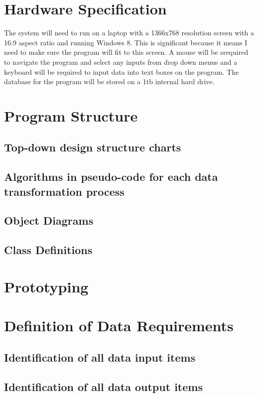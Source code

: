 \section{Hardware Specification}
The system will need to run on a laptop with a 1366x768 resolution screen with a 16:9  aspect ratio and running Windows 8. This is significant because it means I need to make sure the program will fit to this screen. A mouse will be srequired to navigate the program and select any inputs from drop down menus and a keyboard will be required to input data into text boxes on the program. The database for the program will be stored on a 1tb internal hard drive.
\section{Program Structure}

\subsection{Top-down design structure charts}

\subsection{Algorithms in pseudo-code for each data transformation process}

\subsection{Object Diagrams}

\subsection{Class Definitions}

\section{Prototyping}

\section{Definition of Data Requirements}

\subsection{Identification of all data input items}

\subsection{Identification of all data output items}

